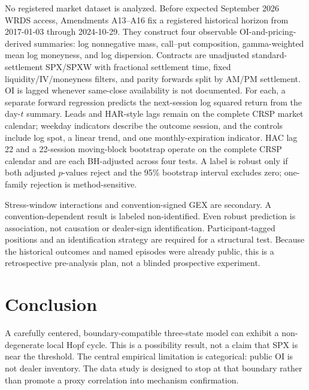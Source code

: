 \documentclass[sigconf,review,anonymous]{acmart}
\begin{document}
No registered market dataset is analyzed. Before expected September 2026 WRDS
access, Amendments A13--A16 fix a registered historical horizon from 2017-01-03
through 2024-10-29. They
construct four observable OI-and-pricing-derived summaries: log nonnegative mass,
call--put composition, gamma-weighted mean log moneyness, and log dispersion.
Contracts are unadjusted standard-settlement SPX/SPXW with fractional
settlement time, fixed liquidity/IV/moneyness filters, and parity forwards
split by AM/PM settlement. OI is lagged whenever same-close availability is
not documented.
For each, a separate forward regression predicts the next-session log squared
return from the day-$t$ summary. Leads and HAR-style lags
remain on the complete CRSP market calendar; weekday indicators describe the
outcome session, and the controls include log spot, a linear trend, and one
monthly-expiration indicator. HAC lag 22 and a 22-session moving-block
bootstrap operate on the complete CRSP calendar and are each BH-adjusted across four tests.
A label is robust only if both adjusted $p$-values reject and the 95\%
bootstrap interval excludes zero; one-family rejection is method-sensitive.

Stress-window interactions and convention-signed GEX are secondary. A
convention-dependent result is labeled non-identified. Even robust prediction
is association, not causation or dealer-sign identification. Participant-tagged
positions and an identification strategy are required for a structural test.
Because the historical outcomes and named episodes were already public, this
is a retrospective pre-analysis plan, not a blinded prospective experiment.

\section{Conclusion}

A carefully centered, boundary-compatible three-state model can exhibit a
non-degenerate local Hopf cycle. This is a possibility result, not a claim that
SPX is near the threshold. The central empirical limitation is categorical:
public OI is not dealer inventory. The data study is designed to stop at that
boundary rather than promote a proxy correlation into mechanism confirmation.



\end{document}
